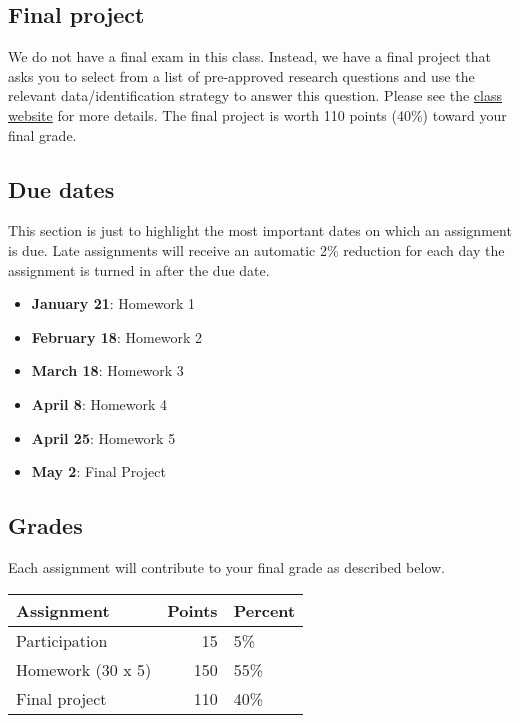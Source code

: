 \documentclass[11pt,]{article}
\providecommand{\tightlist}{%
  \setlength{\itemsep}{0pt}\setlength{\parskip}{0pt}}
\begin{document}
\hypertarget{final-project}{%
\subsection{Final project}\label{final-project}}

We do not have a final exam in this class. Instead, we have a final
project that asks you to select from a list of pre-approved research
questions and use the relevant data/identification strategy to answer
this question. Please see the
\href{https://econ470s22.classes.ianmccarthyecon.com/}{class website}
for more details. The final project is worth 110 points (40\%) toward
your final grade.

\hypertarget{due-dates}{%
\subsection{Due dates}\label{due-dates}}

This section is just to highlight the most important dates on which an
assignment is due. Late assignments will receive an automatic 2\%
reduction for each day the assignment is turned in after the due date.

\begin{itemize}
\tightlist
\item
  \textbf{January 21}: Homework 1
\item
  \textbf{February 18}: Homework 2
\item
  \textbf{March 18}: Homework 3
\item
  \textbf{April 8}: Homework 4
\item
  \textbf{April 25}: Homework 5
\item
  \textbf{May 2}: Final Project
\end{itemize}

\hypertarget{grades}{%
\subsection{Grades}\label{grades}}

Each assignment will contribute to your final grade as described below.

\begin{longtable}[]{@{}lrl@{}}
\toprule
Assignment & Points & Percent \\
\midrule
\endhead
Participation & 15 & 5\% \\
Homework (30 x 5) & 150 & 55\% \\
Final project & 110 & 40\% \\
\bottomrule
\end{longtable}
\end{document}
